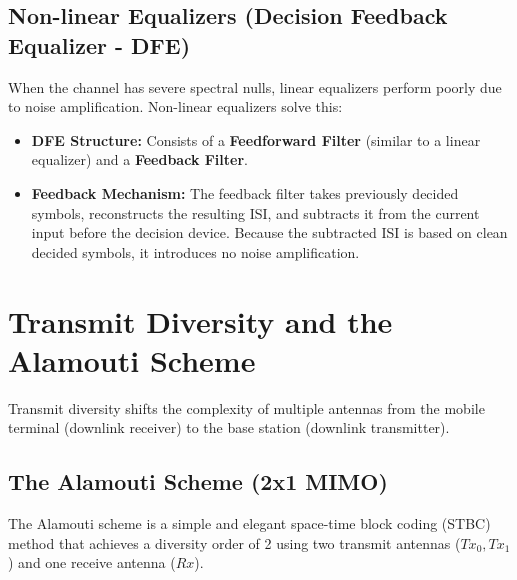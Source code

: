 \documentclass[12pt,a4paper]{article}
\begin{document}
\subsection{Non-linear Equalizers (Decision Feedback Equalizer - DFE)}
When the channel has severe spectral nulls, linear equalizers perform poorly due to noise amplification. Non-linear equalizers solve this:
\begin{itemize}[leftmargin=*, itemsep=3.0pt]
  \item \textbf{DFE Structure:} Consists of a \textbf{Feedforward Filter} (similar to a linear equalizer) and a \textbf{Feedback Filter}.
  \item \textbf{Feedback Mechanism:} The feedback filter takes previously decided symbols, reconstructs the resulting ISI, and subtracts it from the current input before the decision device. Because the subtracted ISI is based on clean decided symbols, it introduces no noise amplification.
\end{itemize}

\section{Transmit Diversity and the Alamouti Scheme}

Transmit diversity shifts the complexity of multiple antennas from the mobile terminal (downlink receiver) to the base station (downlink transmitter).

\subsection{The Alamouti Scheme (2x1 MIMO)}
The Alamouti scheme is a simple and elegant space-time block coding (STBC) method that achieves a diversity order of 2 using two transmit antennas ($Tx_0, Tx_1$) and one receive antenna ($Rx$).
\end{document}
